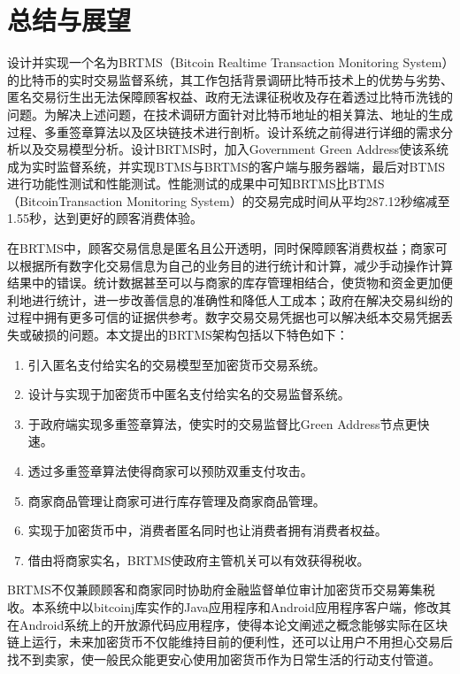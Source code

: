   
\chapter{总结与展望}
设计并实现一个名为BRTMS（Bitcoin Realtime Transaction Monitoring System）的比特币的实时交易监督系统，其工作包括背景调研比特币技术上的优势与劣势、匿名交易衍生出无法保障顾客权益、政府无法课征税收及存在着透过比特币洗钱的问题。为解决上述问题，在技术调研方面针对比特币地址的相关算法、地址的生成过程、多重签章算法以及区块链技术进行剖析。设计系统之前得进行详细的需求分析以及交易模型分析。设计BRTMS时，加入Government Green Address使该系统成为实时监督系统，并实现BTMS与BRTMS的客户端与服务器端，最后对BTMS进行功能性测试和性能测试。性能测试的成果中可知BRTMS比BTMS（BitcoinTransaction Monitoring System）的交易完成时间从平均287.12秒缩减至1.55秒，达到更好的顾客消费体验。

在BRTMS中，顾客交易信息是匿名且公开透明，同时保障顾客消费权益；商家可以根据所有数字化交易信息为自己的业务目的进行统计和计算，减少手动操作计算结果中的错误。统计数据甚至可以与商家的库存管理相结合，使货物和资金更加便利地进行统计，进一步改善信息的准确性和降低人工成本；政府在解决交易纠纷的过程中拥有更多可信的证据供参考。数字交易交易凭据也可以解决纸本交易凭据丢失或破损的问题。本文提出的BRTMS架构包括以下特色如下：
		\begin{enumerate}
			\item 引入匿名支付给实名的交易模型至加密货币交易系统。
			\item 设计与实现于加密货币中匿名支付给实名的交易监督系统。
			\item 于政府端实现多重签章算法，使实时的交易监督比Green Address节点更快速。
			\item 透过多重签章算法使得商家可以预防双重支付攻击。
			\item 商家商品管理让商家可进行库存管理及商家商品管理。
			\item 实现于加密货币中，消费者匿名同时也让消费者拥有消费者权益。
			\item 借由将商家实名，BRTMS使政府主管机关可以有效获得税收。
		\end{enumerate}



		
BRTMS不仅兼顾顾客和商家同时协助府金融监督单位审计加密货币交易筹集税收。本系统中以bitcoinj库实作的Java应用程序和Android应用程序客户端，修改其在Android系统上的开放源代码应用程序，使得本论文阐述之概念能够实际在区块链上运行，未来加密货币不仅能维持目前的便利性，还可以让用户不用担心交易后找不到卖家，使一般民众能更安心使用加密货币作为日常生活的行动支付管道。
